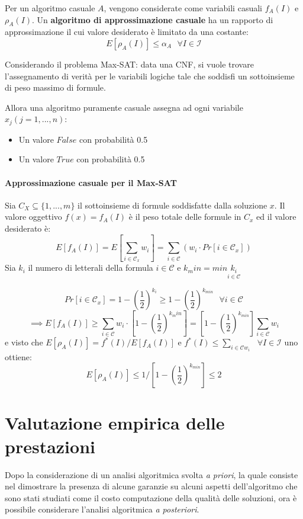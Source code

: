 \documentclass{article}
\begin{document}
Per un algoritmo casuale $A$, vengono considerate come variabili casuali $f_A(I)$ e $\rho_A(I)$. Un
\textbf{algoritmo di approssimazione casuale} ha un rapporto di approssimazione il cui valore desiderato
è limitato da una costante:
$$E[\rho_A(I)]\leq\alpha_A\text{  }\forall I\in\mathcal{I}$$

Considerando il problema Max-SAT: data una CNF, si vuole trovare l'assegnamento di verità per le variabili logiche
tale che soddisfi un sottoinsieme di peso massimo di formule.

Allora una algoritmo puramente casuale assegna ad ogni variabile $x_j(j=1,...,n)$:
\begin{itemize}
    \item Un valore $False$ con probabilità 0.5
    \item Un valore $True$ con probabilità 0.5
\end{itemize}

\paragraph{Approssimazione casuale per il Max-SAT} Sia $C_X\subseteq\{1,...,m\}$ il sottoinsieme
di formule soddisfatte dalla soluzione $x$. Il valore oggettivo $f(x)=f_A(I)$ è il peso totale
delle formule in $C_x$ ed il valore desiderato è:
$$E[f_A(I)]=E\left[\sum_{i\in \mathcal{C}_x}w_i\right] = \sum_{i\in \mathcal{C}}(w_i\cdot Pr[i\in \mathcal{C}_x])$$
Sia $k_i$ il numero di letterali della formula $i\in \mathcal{C}$ e $k_min = min\underset{i\in \mathcal{C}}{k_i}$

$$Pr[i\in \mathcal{C}_x]=1-\left(\frac{1}{2}\right)^{k_i}\geq 1-\left(\frac{1}{2}\right)^{k_{min}}\text{  }\forall i\in \mathcal{C}$$
$$\implies E[f_A(I)]\geq\sum_{i\in \mathcal{C}}w_i\cdot\left[1-\left(\frac{1}{2}\right)^{k_min}\right]=\left[1-\left(\frac{1}{2}\right)^{k_{min}}\right]\sum_{i\in \mathcal{C}}w_i$$
e visto che $E[\rho_A(I)]=f^*(I)/E[f_A(I)]$ e $f^*(I)\leq\sum_{i\in \mathcal{C}w_i}\text{  }\forall I\in\mathcal{I}$
uno ottiene:
$$E[\rho_A(I)]\leq 1/\left[1-\left(\frac{1}{2}\right)^{k_{min}}\right]\leq 2$$

\section{Valutazione empirica delle prestazioni}
Dopo la considerazione di un analisi algoritmica svolta \textit{a priori}, la quale consiste
nel dimostrare la presenza di alcune garanzie su alcuni aspetti dell'algoritmo che
sono stati studiati come il costo computazione della qualità delle soluzioni, ora
è possibile considerare l'analisi algoritmica \textit{a posteriori}.
\end{document}
